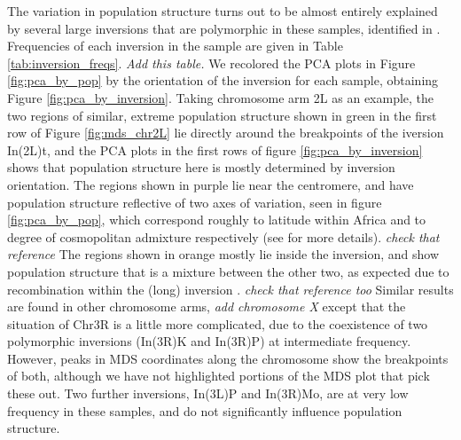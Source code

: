 \documentclass[11pt, oneside]{article}   	%
\newcommand{\plr}[1]{{\em \color{blue} #1}}
\begin{document}
The variation in population structure turns out to be almost entirely explained by
several large inversions that are polymorphic in these samples, identified in \citet{corbett2012population}. 
Frequencies of each inversion in the sample are given in Table \ref{tab:inversion_freqs}.
\plr{Add this table.}
We recolored the PCA plots in Figure \ref{fig:pca_by_pop} by the orientation of the inversion for each sample,
obtaining Figure \ref{fig:pca_by_inversion}.
Taking chromosome arm 2L as an example,
the two regions of similar, extreme population structure
shown in green in the first row of Figure \ref{fig:mds_chr2L}
lie directly around the breakpoints of the iversion In(2L)t,
and the PCA plots in the first rows of figure \ref{fig:pca_by_inversion}
shows that population structure here is mostly determined by inversion orientation.
The regions shown in purple lie near the centromere,
and have population structure reflective of two axes of variation,
seen in figure \ref{fig:pca_by_pop},
which correspond roughly to latitude within Africa and to degree of cosmopolitan admixture respectively
(see \citet{pool2015natural} for more details).
\plr{check that reference}
The regions shown in orange mostly lie inside the inversion,
and show population structure that is a mixture between the other two,
as expected due to recombination within the (long) inversion \citep{kirkpatrick2015chromosome}.
\plr{check that reference too}
Similar results are found in other chromosome arms,
\plr{add chromosome X}
except that the situation of Chr3R is a little more complicated,
due to the coexistence of two polymorphic inversions (In(3R)K and In(3R)P) at intermediate frequency.
However, peaks in MDS coordinates along the chromosome show the breakpoints of both,
although we have not highlighted portions of the MDS plot that pick these out.
Two further inversions, In(3L)P and In(3R)Mo, are at very low frequency in these samples, 
and do not significantly influence population structure.
\end{document}
